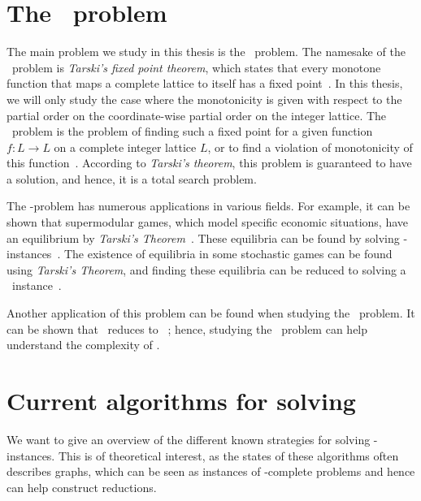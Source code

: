 \section{The \Tarski\ problem}\label{sec:intro_tarski_problem}

The main problem we study in this thesis is the \Tarski\ problem. The namesake of the \Tarski\ problem is \textit{Tarski's fixed point theorem}, which states that every monotone function that maps a complete lattice to itself has a fixed point~. In this thesis, we will only study the case where the monotonicity is given with respect to the partial order on the coordinate-wise partial order on the integer lattice. The \Tarski\ problem is the problem of finding such a fixed point for a given function $f : L \rightarrow L$ on a complete integer lattice $L$, or to find a violation of monotonicity of this function~. According to \textit{Tarski's theorem}, this problem is guaranteed to have a solution, and hence, it is a total search problem.

The \Tarski-problem has numerous applications in various fields. For example, it can be shown that supermodular games, which model specific economic situations, have an equilibrium by \textit{Tarski's Theorem}~. These equilibria can be found by solving \Tarski-instances~\cite{etessami_tarskis_2020}. The existence of equilibria in some stochastic games can be found using \textit{Tarski's Theorem}, and finding these equilibria can be reduced to solving a \Tarski\ instance~.

Another application of this problem can be found when studying the \Arrival\ problem. It can be shown that \Arrival\ reduces to \Tarski~; hence, studying the \Tarski\ problem can help understand the complexity of \Arrival.

\section{Current algorithms for solving \Tarski}\label{sec:intro_tarski_algorithms}

We want to give an overview of the different known strategies for solving \Tarski-instances. This is of theoretical interest, as the states of these algorithms often describes graphs, which can be seen as instances of \TFNP-complete problems and hence can help construct reductions.

